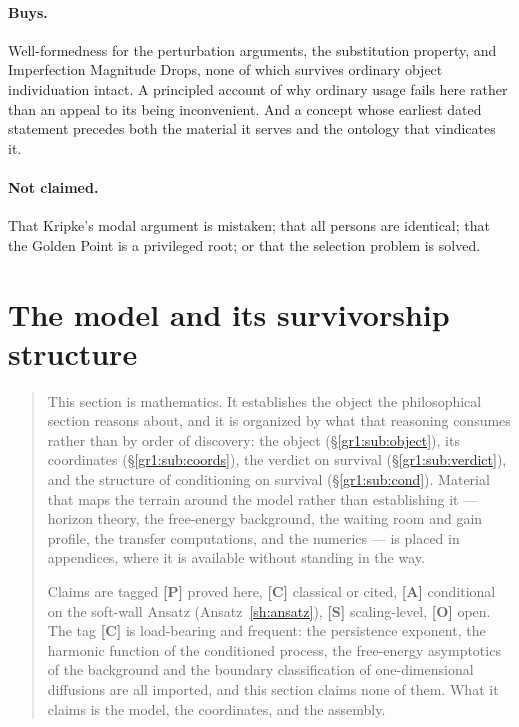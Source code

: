 \documentclass[11pt]{article}
\numberwithin{equation}{section}
\theoremstyle{plain}
\theoremstyle{definition}
\theoremstyle{remark}
\begin{document}
\paragraph{Buys.} Well-formedness for the perturbation arguments, the
substitution property, and Imperfection Magnitude Drops, none of which
survives ordinary object individuation intact. A principled account of
why ordinary usage fails here rather than an appeal to its being
inconvenient. And a concept whose earliest dated statement precedes both
the material it serves and the ontology that vindicates it.

\paragraph{Not claimed.} That Kripke's modal argument is mistaken; that
all persons are identical; that the Golden Point is a privileged root;
or that the selection problem is solved.


\section{The model and its survivorship structure}\label{gr1:sec}

\begin{quote}\small
This section is mathematics. It establishes the object the philosophical
section reasons about, and it is organized by what that reasoning
consumes rather than by order of discovery: the object
(\S\ref{gr1:sub:object}), its coordinates (\S\ref{gr1:sub:coords}), the
verdict on survival (\S\ref{gr1:sub:verdict}), and the structure of
conditioning on survival (\S\ref{gr1:sub:cond}). Material that maps the
terrain around the model rather than establishing it --- horizon theory,
the free-energy background, the waiting room and gain profile, the
transfer computations, and the numerics --- is placed in appendices,
where it is available without standing in the way.

Claims are tagged \textbf{[P]} proved here, \textbf{[C]} classical or
cited, \textbf{[A]} conditional on the soft-wall Ansatz
(Ansatz~\ref{sh:ansatz}), \textbf{[S]} scaling-level, \textbf{[O]}
open. The tag \textbf{[C]} is load-bearing and frequent: the persistence
exponent, the harmonic function of the conditioned process, the
free-energy asymptotics of the background and the boundary
classification of one-dimensional diffusions are all imported, and this
section claims none of them. What it claims is the model, the
coordinates, and the assembly.
\end{quote}
\end{document}
